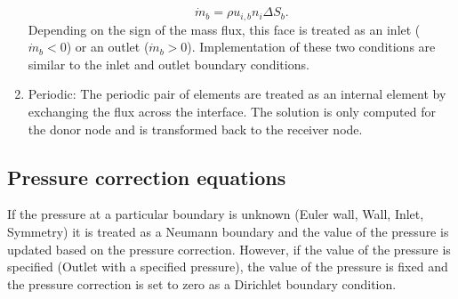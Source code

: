 \begin{enumerate}
\begin{equation}
\dot{m}_b = \rho u_{i,b}n_i\Delta S_{b}.
\end{equation}
Depending on the sign of the mass flux, this face is treated as an inlet ($\dot{m}_b < 0$) or an outlet ($\dot{m}_b>0$). Implementation of these two conditions are similar to the inlet and outlet boundary conditions.
    \item Periodic: The periodic pair of elements are treated as an internal element by exchanging the flux across the interface. The solution is only computed for the donor node and is transformed back to the receiver node.
\end{enumerate}{}

\subsection{Pressure correction equations}
If the pressure at a particular boundary is unknown (Euler wall, Wall, Inlet, Symmetry) it is treated as a Neumann boundary and the value of the pressure is updated based on the pressure correction. However, if the value of the pressure is specified (Outlet with a specified pressure), the value of the pressure is fixed and the pressure correction is set to zero as a Dirichlet boundary condition.






